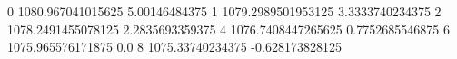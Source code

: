 0 1080.967041015625 5.00146484375
1 1079.2989501953125 3.3333740234375
2 1078.2491455078125 2.2835693359375
4 1076.7408447265625 0.7752685546875
6 1075.965576171875 0.0
8 1075.33740234375 -0.628173828125
